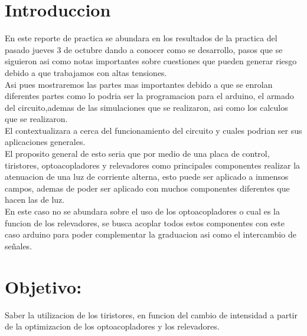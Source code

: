 \documentclass[12pt,a4paper]{article}
\begin{document}
\section{Introduccion}
En este reporte de practica se abundara en los resultados de la practica del pasado jueves 3 de octubre dando a conocer como se desarrollo, pasos que se siguieron asi como notas importantes sobre cuestiones que pueden generar riesgo debido a que trabajamos con altas tensiones.\\
Asi pues mostraremos las partes mas importantes debido a que se enrolan diferentes partes como lo podria ser la programacion para el arduino, el armado del circuito,ademas de las simulaciones que se realizaron, asi como los calculos que se realizaron.\\
El contextualizara a cerca del funcionamiento del circuito y cuales podrian ser sus aplicaciones generales.\\
El proposito general de esto seria que por medio de una placa de control, tiristores, optoacopladores y relevadores como principales componentes realizar la atenuacion de una luz de corriente alterna, esto puede ser aplicado a inmensos campos, ademas de poder ser aplicado con muchos componentes diferentes que hacen las de luz.
\\
En este caso no se abundara sobre el uso de los optoacopladores o cual es la funcion de los relevadores, se busca acoplar todos estos componentes con este caso arduino para poder complementar la graduacion asi como el intercambio de señales. 

\section{Objetivo:}
Saber la utilizacion de los tiristores, en funcion del cambio de intensidad a partir de la optimizacion de los optoacopladores y los relevadores.
\end{document}
